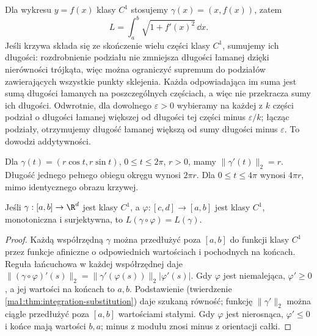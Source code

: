 Dla wykresu $y=f(x)$ klasy $C^1$ stosujemy $\gamma(x)=(x,f(x))$, zatem
\[
 L=\int_a^b\sqrt{1+f'(x)^2}\,\dd x.
\]
Jeśli krzywa składa się ze skończenie wielu części klasy $C^1$, sumujemy ich długości: rozdrobnienie podziału nie zmniejsza długości łamanej dzięki nierówności trójkąta, więc można ograniczyć supremum do podziałów zawierających wszystkie punkty sklejenia. Każda odpowiadająca im suma jest sumą długości łamanych na poszczególnych częściach, a więc nie przekracza sumy ich długości. Odwrotnie, dla dowolnego $\varepsilon>0$ wybieramy na każdej z $k$ części podział o długości łamanej większej od długości tej części minus $\varepsilon/k$; łącząc podziały, otrzymujemy długość łamanej większą od sumy długości minus $\varepsilon$. To dowodzi addytywności.

\begin{przyklad}
\label{ma1:ex:circle-length}
Dla $\gamma(t)=(r\cos t,r\sin t)$, $0\le t\le2\pi$, $r>0$, mamy $\|\gamma'(t)\|_2=r$. Długość jednego pełnego obiegu okręgu wynosi $2\pi r$. Dla $0\le t\le4\pi$ wynosi $4\pi r$, mimo identycznego obrazu krzywej.
\end{przyklad}
\begin{wniosek}
\label{ma1:cor:arc-reparametrization}
Jeśli $\gamma:[a,b]\to\R^d$ jest klasy $C^1$, a $\varphi:[c,d]\to[a,b]$ jest klasy $C^1$, monotoniczna i surjektywna, to $L(\gamma\circ\varphi)=L(\gamma)$.
\end{wniosek}
\begin{proof}
Każdą współrzędną $\gamma$ można przedłużyć poza $[a,b]$ do funkcji klasy $C^1$ przez funkcje afiniczne o odpowiednich wartościach i pochodnych na końcach. Reguła łańcuchowa w każdej współrzędnej daje $\|(\gamma\circ\varphi)'(s)\|_2=\|\gamma'(\varphi(s))\|_2|\varphi'(s)|$. Gdy $\varphi$ jest niemalejąca, $\varphi'\ge0$, a jej wartości na końcach to $a,b$. Podstawienie (twierdzenie \ref{ma1:thm:integration-substitution}) daje szukaną równość; funkcję $\|\gamma'\|_2$ można ciągle przedłużyć poza $[a,b]$ wartościami stałymi. Gdy $\varphi$ jest nierosnąca, $\varphi'\le0$ i końce mają wartości $b,a$; minus z modułu znosi minus z orientacji całki.
\end{proof}

